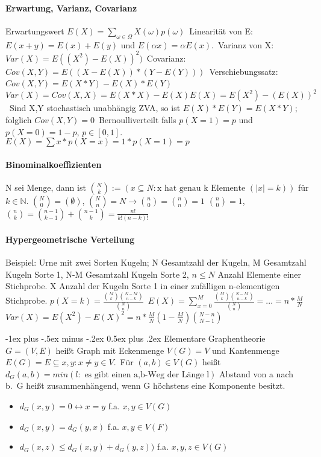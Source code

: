 \documentclass[10pt,landscape]{article}
\makeatletter
\renewcommand{\section}{\@startsection{section}{1}{0mm}%
                                {-1ex plus -.5ex minus -.2ex}%
                                {0.5ex plus .2ex}%
                                {\normalfont\large\bfseries}}
\makeatother
\begin{document}
\begin{multicols}{3}
\paragraph{Erwartung, Varianz, Covarianz}
Erwartungswert $E(X) = \sum_{\omega \in \Omega} X(\omega)p(\omega)$\
Linearität von E: $E(x+y)=E(x)+E(y)$ und $E(\alpha x)=\alpha E(x)$.\
Varianz von X: $Var(X)=E((X^2)-E(X))^2)$\
Covarianz: $Cov(X,Y)=E((X-E(X))*(Y-E(Y)))$\
Verschiebungssatz: $Cov(X,Y)=E(X*Y)-E(X)*E(Y)$\
$Var(X)=Cov(X,X)=E(X*X)-E(X)E(X)=E(X^2)-(E(X))^2$\
Sind X,Y stochastisch unabhängig ZVA, so ist $E(X)*E(Y)=E(X*Y)$; folglich $Cov(X,Y)=0$\
Bernoulliverteilt falls $p(X=1)=p$ und $p(X=0)=1-p$, $p\in [0,1]$. $E(X)=\sum x*p(X=x)= 1*p(X=1)=p$

\paragraph{Binominalkoeffizienten}
N sei Menge, dann ist $\binom{N}{k} := (x \subseteq N: \text{x hat genau k Elemente } (|x|=k) )$ für $k\in \mathbb{N}$.
$\binom{N}{0}=(\emptyset)$, $\binom{N}{n}={N}\rightarrow \binom{n}{0}=\binom{n}{n}=1$ $\binom{n}{0}=1$, $\binom{n}{k}=\binom{n-1}{k-1}+\binom{n-1}{k}=\frac{n!}{k!(n-k)!}$

\paragraph{Hypergeometrische Verteilung}
Beispiel: Urne mit zwei Sorten Kugeln; N Gesamtzahl der Kugeln, M Gesamtzahl Kugeln Sorte 1, N-M Gesamtzahl Kugeln Sorte 2, $n\leq N$ Anzahl Elemente einer Stichprobe. X Anzahl der Kugeln Sorte 1 in einer zufälligen n-elementigen Stichprobe.
$p(X=k)=\frac{\binom{M}{k}\binom{N-M}{n-k}}{\binom{N}{n}}$\
$E(X)=\sum_{x=0}^M \frac{\binom{M}{k}\binom{N-M}{n-k}}{\binom{N}{n}}=...=n*\frac{M}{N}$\
$Var(X)=E(X^2)-E(X)^2 = n*\frac{M}{N}(1-\frac{M}{N})\binom{N-n}{N-1}$

\section{Elementare Graphentheorie}
$G=(V,E)$ heißt Graph mit Eckenmenge $V(G)=V$ und Kantenmenge $E(G)=E\subseteq {{x,y}:x\not=y \in V}$.\
Für $(a,b)\in V(G)$ heißt $d_G(a,b)=min(l: \text{ es gibt einen a,b-Weg der Länge l} )$ Abstand von a nach b.\
G heißt zusammenhängend, wenn G höchstens eine Komponente besitzt. 
\begin{itemize}
    \item $d_G(x,y)=0 \leftrightarrow x=y$ f.a. $x,y \in V(G)$
    \item $d_G(x,y)=d_G(y,x)$ f.a. $x,y\in V(F)$
    \item $d_G(x,z)\leq d_G(x,y) + d_G(y,z))$ f.a. $x,y,z \in V(G)$
\end{itemize}


\end{multicols}
\end{document}
